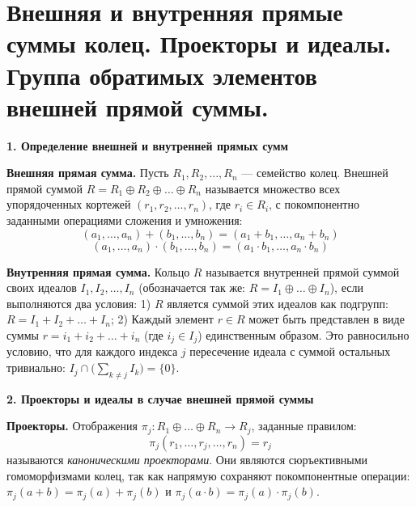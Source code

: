 \documentclass[12pt, a4paper]{article}
\theoremstyle{definition}
\theoremstyle{remark}
\begin{document}
\section{Внешняя и внутренняя прямые суммы колец. Проекторы и идеалы. Группа обратимых элементов внешней прямой суммы.}

\textbf{1. Определение внешней и внутренней прямых сумм}

\textbf{Внешняя прямая сумма.} Пусть $R_1, R_2, \dots, R_n$ — семейство колец. Внешней прямой суммой $R = R_1 \oplus R_2 \oplus \dots \oplus R_n$ называется множество всех упорядоченных кортежей $(r_1, r_2, \dots, r_n)$, где $r_i \in R_i$, с покомпонентно заданными операциями сложения и умножения:
$$ (a_1, \dots, a_n) + (b_1, \dots, b_n) = (a_1 + b_1, \dots, a_n + b_n) $$
$$ (a_1, \dots, a_n) \cdot (b_1, \dots, b_n) = (a_1 \cdot b_1, \dots, a_n \cdot b_n) $$

\textbf{Внутренняя прямая сумма.} Кольцо $R$ называется внутренней прямой суммой своих идеалов $I_1, I_2, \dots, I_n$ (обозначается так же: $R = I_1 \oplus \dots \oplus I_n$), если выполняются два условия:
1) $R$ является суммой этих идеалов как подгрупп: $R = I_1 + I_2 + \dots + I_n$;
2) Каждый элемент $r \in R$ может быть представлен в виде суммы $r = i_1 + i_2 + \dots + i_n$ (где $i_j \in I_j$) единственным образом. Это равносильно условию, что для каждого индекса $j$ пересечение идеала с суммой остальных тривиально: $I_j \cap \Big(\sum_{k \neq j} I_k\Big) = \{0\}$.

\textbf{2. Проекторы и идеалы в случае внешней прямой суммы}

\textbf{Проекторы.} Отображения $\pi_j: R_1 \oplus \dots \oplus R_n \to R_j$, заданные правилом:
$$ \pi_j(r_1, \dots, r_j, \dots, r_n) = r_j $$
называются \textit{каноническими проекторами}. 
Они являются сюръективными гомоморфизмами колец, так как напрямую сохраняют покомпонентные операции: $\pi_j(a+b) = \pi_j(a)+\pi_j(b)$ и $\pi_j(a \cdot b) = \pi_j(a) \cdot \pi_j(b)$.
\end{document}
